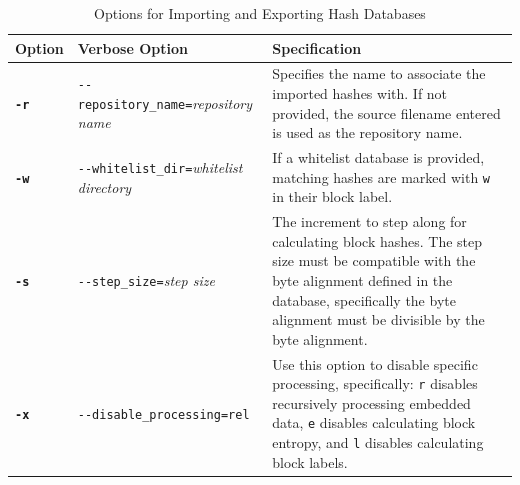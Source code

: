 \documentclass[11pt,fleqn]{article} %
\begin{document}
\begin{table}[!ht]
\centering
\caption{Options for Importing and Exporting Hash Databases}
\label{tab:ImportExportOptions}
\begin{tabular}{|p{1.5 cm}|p{8 cm}|p{4 cm}|}
\hline \hline
\textbf{Option} & \textbf{Verbose Option} & \textbf{Specification} \\
\hline
\textbf{\texttt{-r}} & \verb+--repository_name=+\textit{repository name} & Specifies the name to associate the imported hashes with. If not provided, the source filename entered is used as the repository name.\\
\hline
\textbf{\texttt{-w}} & \verb+--whitelist_dir=+\textit{whitelist directory} & If a whitelist database is provided, matching hashes are marked with \verb+w+ in their block label.\\
\hline
\textbf{\texttt{-s}} & \verb+--step_size=+\textit{step size} & The increment to step along for calculating block hashes. The step size must be compatible with the byte alignment defined in the database, specifically the byte alignment must be divisible by the byte alignment.\\
\hline
\textbf{\texttt{-x}} & \verb+--disable_processing=rel+ & Use this option to disable specific processing, specifically: \verb+r+ disables recursively processing embedded data, \verb+e+ disables calculating block entropy, and \verb+l+ disables calculating block labels.\\
\hline
\end{tabular}
\end{table}
\end{document}

